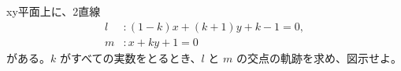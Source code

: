 \documentclass[8pt,dvipdfmx]{article}[b5paper]
\begin{document}
\begin{tcolorbox}[title=数学\textcircled{1} 5-5 C]
xy平面上に、2直線
\begin{align*}
    l&: (1 - k)x + (k + 1)y + k - 1 = 0, \\
    m&: x + ky + 1 = 0
\end{align*}
がある。$k$ がすべての実数をとるとき、$l$ と $m$ の交点の軌跡を求め、図示せよ。
\end{tcolorbox}
\end{document}
